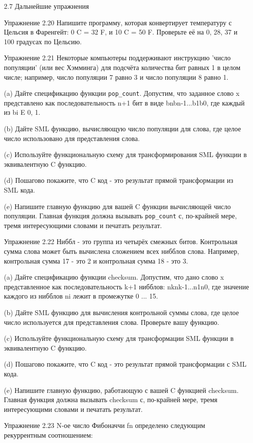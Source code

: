 2.7 Дальнейшие упражнения

Упражнение 2.20 Напишите программу, которая конвертирует температуру с Цельсия в Фаренгейт: 0 C = 32 F, и 10 C = 50 F. Проверьте её на 0, 28, 37 и 100 градусах по Цельсию.

Упражнение 2.21 Некоторые компьютеры поддерживают инструкцию 'число популяции' (или вес Хэмминга) для подсчёта количества бит равных 1 в целом числе; например, число популяции 7 равно 3 и число популяции 8 равно 1.

(a) Дайте спецификацию функции \lstinline|pop_count|. Допустим, что заданное слово x представлено как последовательность n+1 бит в виде bnbn-1...b1b0, где каждый из bi E {0, 1}.

(b) Дайте SML функцию, вычисляющую число популяции для слова, где целое число использовано для представления слова.

(c) Используйте функциональную схему для трансформирования SML функции в эквивалентную C функцию.

(d) Пошагово покажите, что C код - это результат прямой трансформации из SML кода.

(e) Напишите главную функцию для вашей C функции вычисляющей число популяции. Главная функция должна вызывать \lstinline|pop_count| с, по-крайней мере, тремя интересующими словами и печатать результат.

Упражнение 2.22 Ниббл - это группа из четырёх смежных битов. Контрольная сумма слова может быть вычислена сложением всех нибблов слова. Например, контрольная сумма 17 - это 2 и контрольная сумма 18 - это 3.

(a) Дайте спецификацию функции checksum. Допустим, что дано слово x представленное как последовательность k+1 нибблов: nknk-1...n1n0, где значение каждого из нибблов ni лежит в промежутке 0 ... 15.

(b) Дайте SML функцию для вычисления контрольной суммы слова, где целое число используется для представления слова. Проверьте вашу функцию.

(c) Используйте функциональную схему для трансформации SML функции в эквивалентную C функцию.

(d) Пошагово покажите, что C код - это результат прямой трансформации с SML кода.

(e) Напишите главную функцию, работающую с вашей C функцией checksum. Главная функция должна вызывать checksum с, по-крайней мере, тремя интересующими словами и печатать результат.

Упражнение 2.23 N-ое число Фибоначчи fn определено следующим рекуррентным соотношением:

